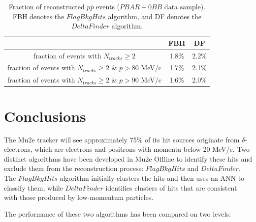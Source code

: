 \begin{center}
        \begin{table}[h!]
        \centering
        \renewcommand{\arraystretch}{1.}
        \begin{tabular}{| c | c | c |} 
            \hline
            &  FBH & DF\\
            \hline
            fraction of events with $N_{tracks} \geq 2$ &  1.8\% & 2.2\%\\
            \hline
            fraction of events with $N_{tracks} \geq 2$ \& $p>$80 MeV/c & 1.7\% & 2.1\%\\
            \hline
            fraction of events with $N_{tracks} \geq 2$ \& $p>$90 MeV/c & 1.6\% & 2.0\%\\
            \hline
            \end{tabular}
        \caption[Fraction of reconstructed $p\bar{p}$ events.]{Fraction of reconstructed $p\bar{p}$ events 
        ($PBAR-0BB$ data sample). FBH denotes the $FlagBkgHits$ algorithm, 
        and DF denotes the $DeltaFinder$ algorithm.}
        \end{table}\label{tab:recoeffpbar}
\end{center}

\section{Conclusions}
The Mu2e tracker will see approximately 75\% of its hit 
sources originate from $\delta$-electrons, which are electrons 
and positrons with momenta below 20 MeV/c. Two distinct algorithms 
have been developed in Mu2e Offline to identify these hits and exclude 
them from the reconstruction process: $FlagBkgHits$ and $DeltaFinder$. 
The $FlagBkgHits$ algorithm initially clusters the hits and then uses an ANN 
to classify them, while $DeltaFinder$ identifies clusters of hits that are 
consistent with those produced by low-momentum particles.

The performance of these two algorithms has been compared on two levels:

